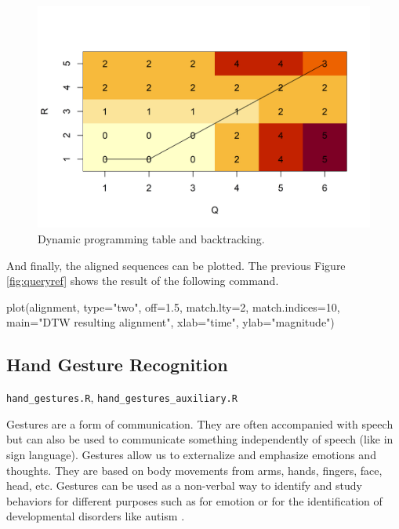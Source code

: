 \documentclass[
  11pt,
]{krantz}
\makeatletter
\newenvironment{Shaded}{\begin{snugshade}}{\end{snugshade}}
\newcommand{\AttributeTok}[1]{\textcolor[rgb]{0.61,0.61,0.61}{#1}}
\newcommand{\DecValTok}[1]{\textcolor[rgb]{0.06,0.06,0.06}{#1}}
\newcommand{\FloatTok}[1]{\textcolor[rgb]{0.06,0.06,0.06}{#1}}
\newcommand{\FunctionTok}[1]{\textcolor[rgb]{0,0,0}{#1}}
\newcommand{\NormalTok}[1]{#1}
\newcommand{\StringTok}[1]{\textcolor[rgb]{0.5,0.5,0.5}{#1}}
\newenvironment{kframe}{%
\medskip{}
\setlength{\fboxsep}{.8em}
 \def\at@end@of@kframe{}%
 \ifinner\ifhmode%
  \def\at@end@of@kframe{\end{minipage}}%
  \begin{minipage}{\columnwidth}%
 \fi\fi%
 \def\FrameCommand##1{\hskip\@totalleftmargin \hskip-\fboxsep
 \colorbox{shadecolor}{##1}\hskip-\fboxsep
     \hskip-\linewidth \hskip-\@totalleftmargin \hskip\columnwidth}%
 \MakeFramed {\advance\hsize-\width
   \@totalleftmargin\z@ \linewidth\hsize
   \@setminipage}}%
 {\par\unskip\endMakeFramed%
 \at@end@of@kframe}
\newenvironment{rmdblock}[1]
  {
  \begin{itemize}
  \renewcommand{\labelitemi}{
    \raisebox{-.7\height}[0pt][0pt]{
      {\setkeys{Gin}{width=3em,keepaspectratio}\texttt{[image: images/icons/\#1]}}
    }
  }
  \setlength{\fboxsep}{1em}
  \begin{kframe}
  \item
  }
  {
  \end{kframe}
  \end{itemize}
  }
\newenvironment{rmdfolder}
  {\begin{rmdblock}{folder}}
  {\end{rmdblock}}
\makeatother
\begin{document}
\begin{figure}

{\centering \includegraphics[width=0.9\linewidth]{images/backtracking} 

}

\caption{Dynamic programming table and backtracking.}\label{fig:backtracking}
\end{figure}

And finally, the aligned sequences can be plotted. The previous Figure \ref{fig:queryref} shows the result of the following command.

\begin{Shaded}
\begin{Highlighting}[]
\FunctionTok{plot}\NormalTok{(alignment, }\AttributeTok{type=}\StringTok{"two"}\NormalTok{, }\AttributeTok{off=}\FloatTok{1.5}\NormalTok{,}
     \AttributeTok{match.lty=}\DecValTok{2}\NormalTok{,}
     \AttributeTok{match.indices=}\DecValTok{10}\NormalTok{,}
     \AttributeTok{main=}\StringTok{"DTW resulting alignment"}\NormalTok{,}
     \AttributeTok{xlab=}\StringTok{"time"}\NormalTok{, }\AttributeTok{ylab=}\StringTok{"magnitude"}\NormalTok{)}
\end{Highlighting}
\end{Shaded}

\hypertarget{sechandgestures}{%
\subsection{Hand Gesture Recognition}\label{sechandgestures}}

\begin{rmdfolder}
\texttt{hand\_gestures.R}, \texttt{hand\_gestures\_auxiliary.R}
\end{rmdfolder}

Gestures are a form of communication. They are often accompanied with speech but can also be used to communicate something independently of speech (like in sign language). Gestures allow us to externalize and emphasize emotions and thoughts. They are based on body movements from arms, hands, fingers, face, head, etc. Gestures can be used as a non-verbal way to identify and study behaviors for different purposes such as for emotion \citep{de2006towards} or for the identification of developmental disorders like autism \citep{anzulewicz2016toward}.
\end{document}
